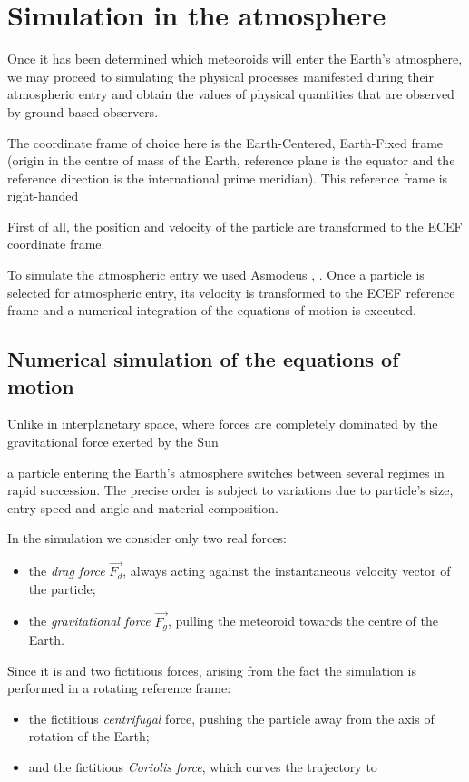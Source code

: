 \section{Simulation in the atmosphere} \label{aa}
    Once it has been determined which meteoroids will enter the Earth's atmosphere, we may proceed to simulating
    the physical processes manifested during their atmospheric entry and obtain the values of physical quantities
    that are observed by ground-based observers.

    The coordinate frame of choice here is the Earth-Centered, Earth-Fixed frame (origin in the centre of mass of the Earth,
    reference plane is the equator and the reference direction is the international prime meridian).
    This reference frame is right-handed

    First of all, the position and velocity of the particle are transformed to the ECEF coordinate frame.

    To simulate the atmospheric entry we used Asmodeus \citep{balaz-thesis}, \citep{balaz+2020}.
    Once a particle is selected for atmospheric entry, its velocity is transformed to the ECEF reference frame
    and a numerical integration of the equations of motion is executed.

    \subsection{Numerical simulation of the equations of motion} \label{aai}
        Unlike in interplanetary space, where forces are completely dominated by the gravitational force
        exerted by the Sun

        a particle entering the Earth's atmosphere switches between several regimes in rapid succession.
        The precise order is subject to variations due to particle's size, entry speed and angle
        and material composition.


        In the simulation we consider only two real forces:
        \begin{itemize}
            \item the \emph{drag force} $\vec{F_d}$, always acting against the instantaneous velocity vector of the particle;
            \item the \emph{gravitational force} $\vec{F_g}$, pulling the meteoroid towards the centre of the Earth.
        \end{itemize}

        Since it is 
        and two fictitious forces, arising from the fact the simulation is performed in a rotating reference frame:
        \begin{itemize}
            \item the fictitious \emph{centrifugal} force, pushing the particle away from the axis of rotation of the Earth;
            \item and the fictitious \emph{Coriolis force}, which curves the trajectory to
        \end{itemize}

